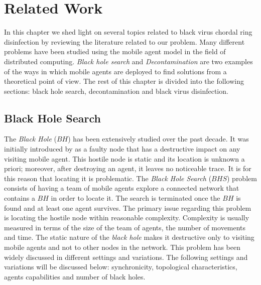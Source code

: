 \chapter {Related Work}
\label{RW}

In this chapter we shed light on several topics related to black virus chordal ring disinfection by reviewing the literature related to our problem. Many different problems have been studied using the mobile agent model in the field of distributed computing. {\em Black hole search} and {\em Decontamination} are two examples of the ways in which mobile agents are deployed to find solutions from a theoretical point of view.  The rest of this chapter is divided into the following sections: black hole search, decontamination and black virus disinfection.

\section{Black Hole Search}
The {\it Black Hole} ($BH$) has been extensively studied over the past decade. It was initially introduced by \cite{dobetal8} as a faulty node that has a destructive impact on any visiting mobile agent. This hostile node is static and its location is unknown a priori; moreover, after destroying an agent, it leaves no noticeable trace. It is for this reason that locating it is problematic.
The {\it Black Hole Search} ($BHS$) problem consists of having a team of mobile agents explore   a connected network that contains a $BH$  in order to locate  it. The search is terminated once the $BH$ is found and at least one agent survives.
The primary issue regarding this problem is locating the hostile node within reasonable complexity. Complexity is usually measured in terms of the size of the team of agents, the number of movements and time.
The static nature of the {\it black hole} makes it destructive only to visiting mobile agents and not to other nodes in the network.  This problem has been widely discussed in different settings and variations. The following settings and variations will be discussed below: synchronicity, topological characteristics, agents capabilities and number of black holes.

